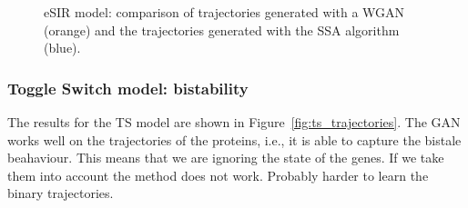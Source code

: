 \documentclass{article}
\begin{document}
\begin{figure}[hb]
    \caption{eSIR model: comparison of trajectories generated with a WGAN (orange) and the trajectories generated with the SSA algorithm (blue).}
    \label{fig:esir_trajectories}
    
    
\end{figure} 

\subsubsection{Toggle Switch model: bistability}
The results for the TS model are shown in Figure~\ref{fig:ts_trajectories}. The GAN works well on the trajectories of the proteins, i.e., it is able to capture the bistale beahaviour. This means that we are ignoring the state of the genes. If we take them into account the method does not work. Probably harder to learn the binary trajectories.
\end{document}
